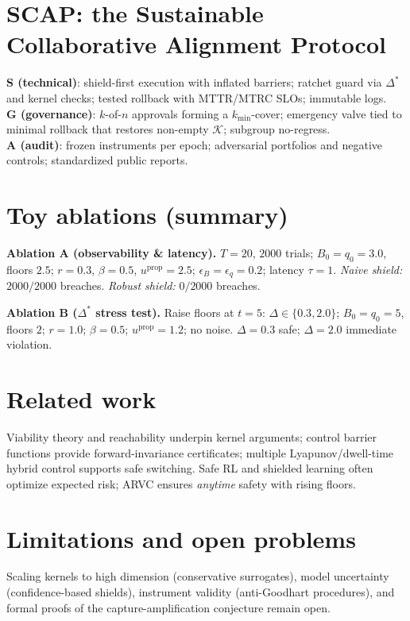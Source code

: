 \documentclass[11pt]{article}
\theoremstyle{definition}
\newcommand{\K}{\mathcal{K}}
\newcommand{\1}{\mathbf{1}}
\begin{document}
\section{SCAP: the Sustainable Collaborative Alignment Protocol}
\textbf{S (technical)}: shield-first execution with inflated barriers; ratchet guard via $\Delta^\ast$ and kernel checks; tested rollback with MTTR/MTRC SLOs; immutable logs.\\
\textbf{G (governance)}: $k$-of-$n$ approvals forming a $k_{\min}$-cover; emergency valve tied to minimal rollback that restores non-empty $\K$; subgroup no-regress.\\
\textbf{A (audit)}: frozen instruments per epoch; adversarial portfolios and negative controls; standardized public reports.

\section{Toy ablations (summary)}
\textbf{Ablation A (observability \& latency).}
$T=20$, $2000$ trials; $B_0=q_0=3.0$, floors $2.5$; $r=0.3$, $\beta=0.5$, $u^{\mathrm{prop}}=2.5$; $\epsilon_B=\epsilon_q=0.2$; latency $\tau=1$. \emph{Naive shield:} $2000/2000$ breaches. \emph{Robust shield:} $0/2000$ breaches.

\textbf{Ablation B ($\Delta^\ast$ stress test).}
Raise floors at $t=5$: $\Delta\in\{0.3,2.0\}$; $B_0=q_0=5$, floors $2$; $r=1.0$; $\beta=0.5$; $u^{\mathrm{prop}}=1.2$; no noise. $\Delta=0.3$ safe; $\Delta=2.0$ immediate violation.

\section{Related work}
Viability theory and reachability underpin kernel arguments; control barrier functions provide forward-invariance certificates; multiple Lyapunov/dwell-time hybrid control supports safe switching. Safe RL and shielded learning often optimize expected risk; ARVC ensures \emph{anytime} safety with rising floors.

\section{Limitations and open problems}
Scaling kernels to high dimension (conservative surrogates), model uncertainty (confidence-based shields), instrument validity (anti-Goodhart procedures), and formal proofs of the capture-amplification conjecture remain open.
\end{document}
